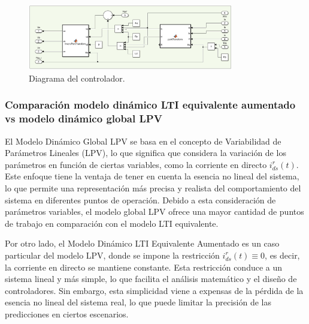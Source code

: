 \documentclass{article}
\begin{document}
\begin{enumerate}[label=\roman*.]
    \begin{figure}[H]
        \centering
        \includegraphics[width=0.8\textwidth]{LTI_AUMENTADO_Q_CONTROLADOR.jpg}
        \caption{Diagrama del controlador.}
    \end{figure}

\end{enumerate}


\subsubsection{Comparación modelo dinámico LTI equivalente aumentado vs modelo dinámico global LPV}

El Modelo Dinámico Global LPV se basa en el concepto de Variabilidad de Parámetros Lineales (LPV), 
lo que significa que considera la variación de los parámetros en función de ciertas variables, como 
la corriente en directo $i^r_{ds}(t)$. Este enfoque tiene la ventaja de tener en cuenta la esencia no 
lineal del sistema, lo que permite una representación más precisa y realista del comportamiento del 
sistema en diferentes puntos de operación. Debido a esta consideración de parámetros variables, el 
modelo global LPV ofrece una mayor cantidad de puntos de trabajo en comparación con el modelo LTI 
equivalente.

Por otro lado, el Modelo Dinámico LTI Equivalente Aumentado es un caso particular del modelo LPV, 
donde se impone la restricción $i^r_{ds}(t) \equiv 0$, es decir, la corriente en directo se mantiene 
constante. Esta restricción conduce a un sistema lineal y más simple, lo que facilita el análisis 
matemático y el diseño de controladores. Sin embargo, esta simplicidad viene a expensas de la pérdida 
de la esencia no lineal del sistema real, lo que puede limitar la precisión de las predicciones en 
ciertos escenarios.
\end{document}

